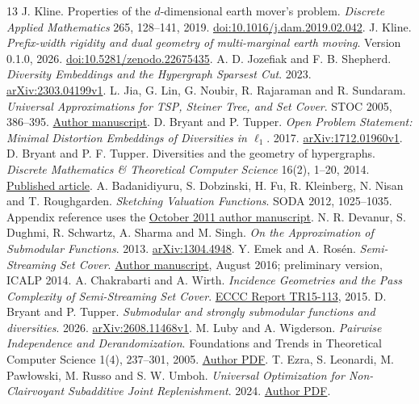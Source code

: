 \documentclass[11pt]{article}
\begin{document}
\clearpage
\begin{thebibliography}{13}\small
{} J. Kline.
Properties of the $d$-dimensional earth mover's problem.
\emph{Discrete Applied Mathematics} 265, 128--141, 2019.
\href{https://doi.org/10.1016/j.dam.2019.02.042}{doi:10.1016/j.dam.2019.02.042}.
 J. Kline.
\emph{Prefix-width rigidity and dual geometry of multi-marginal earth moving}.
Version 0.1.0, 2026.
\href{https://doi.org/10.5281/zenodo.22675435}{doi:10.5281/zenodo.22675435}.
 A. D. Jozefiak and F. B. Shepherd.
\emph{Diversity Embeddings and the Hypergraph Sparsest Cut}.
2023. \href{https://arxiv.org/abs/2303.04199v1}{arXiv:2303.04199v1}.
 L. Jia, G. Lin, G. Noubir, R. Rajaraman and R. Sundaram.
\emph{Universal Approximations for TSP, Steiner Tree, and Set Cover}.
STOC 2005, 386--395.
\href{https://www.khoury.northeastern.edu/~koods/papers/jia05universal.pdf}{Author manuscript}.
 D. Bryant and P. Tupper.
\emph{Open Problem Statement: Minimal Distortion Embeddings of Diversities in $\ell_1$}.
2017. \href{https://arxiv.org/abs/1712.01960v1}{arXiv:1712.01960v1}.
 D. Bryant and P. F. Tupper.
Diversities and the geometry of hypergraphs.
\emph{Discrete Mathematics \& Theoretical Computer Science} 16(2), 1--20, 2014.
\href{https://dmtcs.episciences.org/2080}{Published article}.
 A. Badanidiyuru, S. Dobzinski, H. Fu, R. Kleinberg,
N. Nisan and T. Roughgarden. \emph{Sketching Valuation Functions}.
SODA 2012, 1025--1035. Appendix reference uses the
\href{https://timroughgarden.org/papers/approxxos.pdf}{October 2011 author manuscript}.
 N. R. Devanur, S. Dughmi, R. Schwartz, A. Sharma and M. Singh.
\emph{On the Approximation of Submodular Functions}. 2013.
\href{https://arxiv.org/abs/1304.4948}{arXiv:1304.4948}.
 Y. Emek and A. Ros\'en. \emph{Semi-Streaming Set Cover}.
\href{https://www.irif.fr/~adiro/publ/ER.pdf}{Author manuscript}, August 2016;
preliminary version, ICALP 2014.
 A. Chakrabarti and A. Wirth.
\emph{Incidence Geometries and the Pass Complexity of Semi-Streaming Set Cover}.
\href{https://eccc.weizmann.ac.il/report/2015/113/}{ECCC Report TR15-113}, 2015.
 D. Bryant and P. Tupper.
\emph{Submodular and strongly submodular functions and diversities}. 2026.
\href{https://arxiv.org/abs/2608.11468v1}{arXiv:2608.11468v1}.
 M. Luby and A. Wigderson.
\emph{Pairwise Independence and Derandomization}.
Foundations and Trends in Theoretical Computer Science 1(4), 237--301, 2005.
\href{https://www.ias.edu/sites/default/files/math/csdm/05-06/mluby_pairwise_independence_and_derandomization.pdf}{Author PDF}.
 T. Ezra, S. Leonardi, M. Paw{\l}owski, M. Russo and S. W. Umboh.
\emph{Universal Optimization for Non-Clairvoyant Subadditive Joint Replenishment}.
2024. \href{https://michalpawlowski.github.io/michal-academic/publications/pdfs/03_full_paper.pdf}{Author PDF}.
\end{thebibliography}
\end{document}
